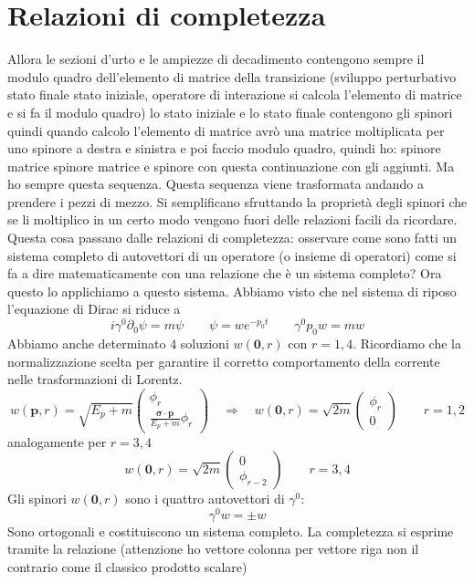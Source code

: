 \section{Relazioni di completezza}
Allora le sezioni d'urto e le ampiezze di decadimento contengono sempre il modulo quadro dell'elemento di matrice della transizione (sviluppo perturbativo stato finale stato iniziale, operatore di interazione si calcola l'elemento di matrice e si fa il modulo quadro) lo stato iniziale e lo stato finale contengono gli spinori quindi quando calcolo l'elemento di matrice avrò una matrice moltiplicata per uno spinore a destra e sinistra e poi faccio modulo quadro, quindi ho: spinore matrice spinore matrice e spinore con questa continuazione con gli aggiunti. Ma ho sempre questa sequenza. Questa sequenza viene trasformata andando a prendere i pezzi di mezzo. Si semplificano sfruttando la proprietà degli spinori che se li moltiplico in un certo modo vengono fuori delle relazioni facili da ricordare. Questa cosa passano dalle relazioni di completezza: osservare come sono fatti un sistema completo di autovettori di un operatore (o insieme di operatori) come si fa a dire matematicamente con una relazione che è un sistema completo? Ora questo lo applichiamo a questo sistema.
Abbiamo visto che nel sistema di riposo l'equazione di Dirac si riduce a
$$
i\gamma^0 \partial_0 \psi = m\psi \qquad \psi = w e^{-p_0 t} \qquad \gamma^0 p_0 w = mw
$$
Abbiamo anche determinato $4$ soluzioni $w(\mathbf{0},r)$ con $r=1,4$. Ricordiamo che la normalizzazione scelta per garantire il corretto comportamento della corrente nelle trasformazioni di Lorentz.
$$
w(\mathbf{p}, r) = \sqrt{E_p + m} \begin{pmatrix} \phi_r \\ \frac{\boldsymbol{\sigma} \cdot \mathbf{p}}{E_p + m} \phi_r \end{pmatrix} \quad \Longrightarrow \quad w(\mathbf{0}, r) = \sqrt{2m} \begin{pmatrix} \phi_r \\ 0 \end{pmatrix} \qquad r = 1,2
$$
analogamente per $r=3,4$
$$
w(\mathbf{0}, r) = \sqrt{2m} \begin{pmatrix} 0 \\ \phi_{r-2} \end{pmatrix} \qquad r = 3,4
$$
Gli spinori $w(\mathbf{0},r)$ sono i quattro autovettori di $\gamma^0$:
$$
\gamma^0 w=\pm w
$$
Sono ortogonali e costituiscono un sistema completo. La completezza si esprime tramite la relazione (attenzione ho vettore colonna per vettore riga non il contrario come il classico prodotto scalare)
